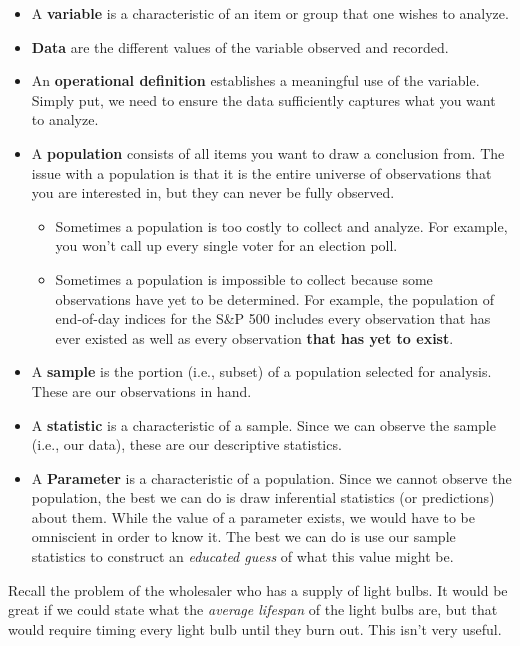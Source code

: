 \documentclass[
]{book}
\begin{document}
\begin{itemize}
\item
  A \textbf{variable} is a characteristic of an item or group that one wishes to analyze.
\item
  \textbf{Data} are the different values of the variable observed and recorded.
\item
  An \textbf{operational definition} establishes a meaningful use of the variable. Simply put, we need to ensure the data sufficiently captures what you want to analyze.
\item
  A \textbf{population} consists of all items you want to draw a conclusion from. The issue with a population is that it is the entire universe of observations that you are interested in, but they can never be fully observed.

  \begin{itemize}
  \item
    Sometimes a population is too costly to collect and analyze. For example, you won't call up every single voter for an election poll.
  \item
    Sometimes a population is impossible to collect because some observations have yet to be determined. For example, the population of end-of-day indices for the S\&P 500 includes every observation that has ever existed as well as every observation \textbf{that has yet to exist}.
  \end{itemize}
\item
  A \textbf{sample} is the portion (i.e., subset) of a population selected for analysis. These are our observations in hand.
\item
  A \textbf{statistic} is a characteristic of a sample. Since we can observe the sample (i.e., our data), these are our descriptive statistics.
\item
  A \textbf{Parameter} is a characteristic of a population. Since we cannot observe the population, the best we can do is draw inferential statistics (or predictions) about them. While the value of a parameter exists, we would have to be omniscient in order to know it. The best we can do is use our sample statistics to construct an \emph{educated guess} of what this value might be.
\end{itemize}

Recall the problem of the wholesaler who has a supply of light bulbs. It would be great if we could state what the \emph{average lifespan} of the light bulbs are, but that would require timing every light bulb until they burn out. This isn't very useful.
\end{document}
